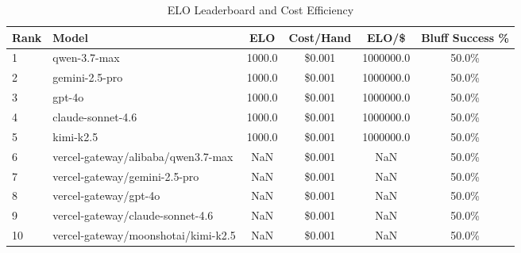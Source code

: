 \begin{table}[ht]
\centering
\caption{ELO Leaderboard and Cost Efficiency}
\label{tab:elo}
\begin{tabular}{@{}llcccc@{}}
\toprule
Rank & Model & ELO & Cost/Hand & ELO/\$ & Bluff Success \% \\ 
\midrule
1 & qwen-3.7-max & 1000.0 & \$0.001 & 1000000.0 & 50.0\% \\ 
2 & gemini-2.5-pro & 1000.0 & \$0.001 & 1000000.0 & 50.0\% \\ 
3 & gpt-4o & 1000.0 & \$0.001 & 1000000.0 & 50.0\% \\ 
4 & claude-sonnet-4.6 & 1000.0 & \$0.001 & 1000000.0 & 50.0\% \\ 
5 & kimi-k2.5 & 1000.0 & \$0.001 & 1000000.0 & 50.0\% \\ 
6 & vercel-gateway/alibaba/qwen3.7-max & NaN & \$0.001 & NaN & 50.0\% \\ 
7 & vercel-gateway/gemini-2.5-pro & NaN & \$0.001 & NaN & 50.0\% \\ 
8 & vercel-gateway/gpt-4o & NaN & \$0.001 & NaN & 50.0\% \\ 
9 & vercel-gateway/claude-sonnet-4.6 & NaN & \$0.001 & NaN & 50.0\% \\ 
10 & vercel-gateway/moonshotai/kimi-k2.5 & NaN & \$0.001 & NaN & 50.0\% \\ 
\bottomrule
\end{tabular}
\end{table}